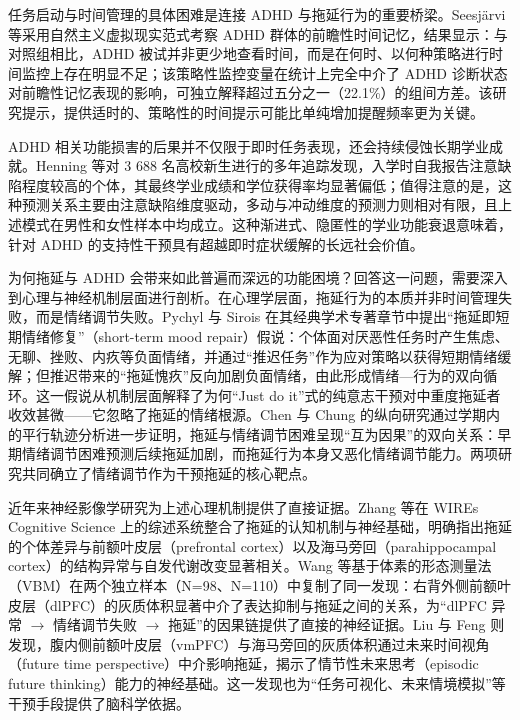 \par 任务启动与时间管理的具体困难是连接 ADHD 与拖延行为的重要桥梁。Seesjärvi 等采用自然主义虚拟现实范式考察 ADHD 群体的前瞻性时间记忆，结果显示：与对照组相比，ADHD 被试并非更少地查看时间，而是在何时、以何种策略进行时间监控上存在明显不足；该策略性监控变量在统计上完全中介了 ADHD 诊断状态对前瞻性记忆表现的影响，可独立解释超过五分之一（22.1\%）的组间方差\cite{seesjarvi2025time}。该研究提示，提供适时的、策略性的时间提示可能比单纯增加提醒频率更为关键。

\par ADHD 相关功能损害的后果并不仅限于即时任务表现，还会持续侵蚀长期学业成就。Henning 等对 3 688 名高校新生进行的多年追踪发现，入学时自我报告注意缺陷程度较高的个体，其最终学业成绩和学位获得率均显著偏低；值得注意的是，这种预测关系主要由注意缺陷维度驱动，多动与冲动维度的预测力则相对有限，且上述模式在男性和女性样本中均成立\cite{henning2022adhd}。这种渐进式、隐匿性的学业功能衰退意味着，针对 ADHD 的支持性干预具有超越即时症状缓解的长远社会价值。

\par 为何拖延与 ADHD 会带来如此普遍而深远的功能困境？回答这一问题，需要深入到心理与神经机制层面进行剖析。在心理学层面，拖延行为的本质并非时间管理失败，而是情绪调节失败。Pychyl 与 Sirois 在其经典学术专著章节中提出``拖延即短期情绪修复''（short-term mood repair）假说\cite{pychyl2016procrastination}：个体面对厌恶性任务时产生焦虑、无聊、挫败、内疚等负面情绪，并通过``推迟任务''作为应对策略以获得短期情绪缓解；但推迟带来的``拖延愧疚''反向加剧负面情绪，由此形成情绪—行为的双向循环。这一假说从机制层面解释了为何``Just do it''式的纯意志干预对中重度拖延者收效甚微——它忽略了拖延的情绪根源。Chen 与 Chung 的纵向研究通过学期内的平行轨迹分析进一步证明，拖延与情绪调节困难呈现``互为因果''的双向关系：早期情绪调节困难预测后续拖延加剧，而拖延行为本身又恶化情绪调节能力\cite{chen2024academic}。两项研究共同确立了情绪调节作为干预拖延的核心靶点。

\par 近年来神经影像学研究为上述心理机制提供了直接证据。Zhang 等在 WIREs Cognitive Science 上的综述系统整合了拖延的认知机制与神经基础，明确指出拖延的个体差异与前额叶皮层（prefrontal cortex）以及海马旁回（parahippocampal cortex）的结构异常与自发代谢改变显著相关\cite{zhang2019cognitive}。Wang 等基于体素的形态测量法（VBM）在两个独立样本（N=98、N=110）中复制了同一发现：右背外侧前额叶皮层（dlPFC）的灰质体积显著中介了表达抑制与拖延之间的关系，为``dlPFC 异常 $\rightarrow$ 情绪调节失败 $\rightarrow$ 拖延''的因果链提供了直接的神经证据\cite{wang2022dlpfc}。Liu 与 Feng 则发现，腹内侧前额叶皮层（vmPFC）与海马旁回的灰质体积通过未来时间视角（future time perspective）中介影响拖延，揭示了情节性未来思考（episodic future thinking）能力的神经基础\cite{liu2019future}。这一发现也为``任务可视化、未来情境模拟''等干预手段提供了脑科学依据。

